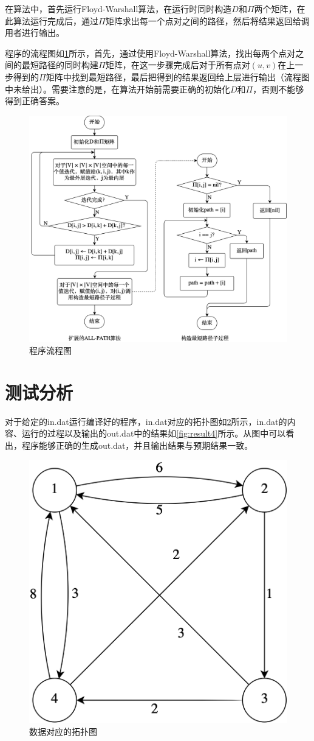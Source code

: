 \documentclass{report}
\begin{document}
在算法中，首先运行Floyd-Warshall算法，在运行时同时构造$D$和$\Pi$两个矩阵，在此算法运行完成后，通过$\Pi$矩阵求出每一个点对之间的路径，然后将结果返回给调用者进行输出。\par

程序的流程图如\ref{fig:flowchart4}所示，首先，通过使用Floyd-Warshall算法，找出每两个点对之间的最短路径的同时构建$\Pi$矩阵，在这一步骤完成后对于所有点对$(u,v)$在上一步得到的$\Pi$矩阵中找到最短路径，最后把得到的结果返回给上层进行输出（流程图中未给出）。需要注意的是，在算法开始前需要正确的初始化$D$和$\Pi$，否则不能够得到正确答案。

\begin{figure}[ht]
    \centering
    \includegraphics[width=0.8\linewidth]{flowchart4.png}
    \caption{程序流程图}
    \label{fig:flowchart4}
\end{figure}

\section{测试分析}
\label{sec:ce_shi_fen_xi_4}
对于给定的in.dat运行编译好的程序，in.dat对应的拓扑图如\ref{fig:description4}所示，in.dat的内容、运行的过程以及输出的out.dat中的结果如\ref{fig:result4}所示。从图中可以看出，程序能够正确的生成out.dat，并且输出结果与预期结果一致。

\begin{figure}[H]
    \centering
    \includegraphics[width=0.3\linewidth]{description4.png}
    \caption{数据对应的拓扑图}
    \label{fig:description4}
\end{figure}
\end{document}
